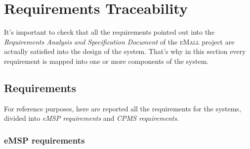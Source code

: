 \chapter{Requirements Traceability} \label{traceability}

It's important to check that all the requirements pointed out into the \textit{Requirements Analysis and Specification Document} of the \textsc{eMall} project are actually satisfied into the design of the system. That's why in this section every requirement is mapped into one or more components of the system.

\section{Requirements}

For reference purposes, here are reported all the requirements for the systems, divided into \textit{eMSP requirements} and \textit{CPMS requirements}.

\subsection{eMSP requirements}

